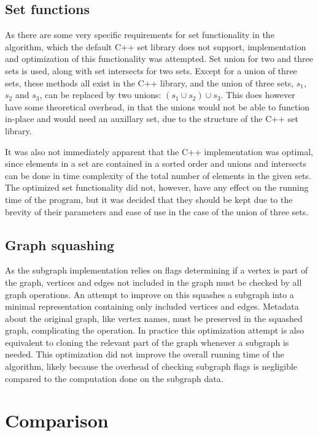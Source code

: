 \documentclass{article}
\begin{document}
		\subsection{Set functions}
		As there are some very specific requirements for set functionality in the algorithm, which the default C++ set library does not support, implementation and optimization of this functionality was attempted.
		Set union for two and three sets is used, along with set intersects for two sets.
		Except for a union of three sets, these methods all exist in the C++ library, and the union of three sets, $s_1$, $s_2$ and $s_3$, can be replaced by two unions: $(s_1 \cup s_2) \cup s_3$.
		This does however have some theoretical overhead, in that the unions would not be able to function in-place and would need an auxillary set, due to the structure of the C++ set library.

		It was also not immediately apparent that the C++ implementation was optimal, since elements in a set are contained in a sorted order and unions and intersects can be done in time complexity of the total number of elements in the given sets.
		The optimized set functionality did not, however, have any effect on the running time of the program, but it was decided that they should be kept due to the brevity of their parameters and ease of use in the case of the union of three sets.
		
		\subsection{Graph squashing}
		As the subgraph implementation relies on flags determining if a vertex is part of the graph, vertices and edges not included in the graph must be checked by all graph operations.
		An attempt to improve on this squashes a subgraph into a minimal representation containing only included vertices and edges.
		Metadata about the original graph, like vertex names, must be preserved in the squashed graph, complicating the operation.
		In practice this optimization attempt is also equivalent to cloning the relevant part of the graph whenever a subgraph is needed. This optimization did not improve the overall running time of the algorithm, likely because the overhead of checking subgraph flags is negligible compared to the computation done on the subgraph data.

	\section{Comparison}
\end{document}
